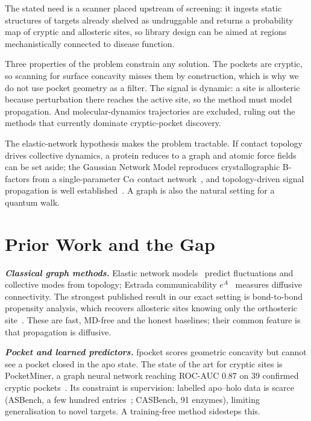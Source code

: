 \documentclass[10pt,a4paper]{article}
\newcommand{\lead}[1]{\textbf{\textit{#1}}}
\begin{document}
The stated need is a scanner placed upstream of screening: it ingests static structures of targets
already shelved as undruggable and returns a probability map of cryptic and allosteric sites, so
library design can be aimed at regions mechanistically connected to disease function.

Three properties of the problem constrain any solution. The pockets are cryptic, so scanning for
surface concavity misses them by construction, which is why we do not use pocket geometry as a
filter. The signal is dynamic: a site is allosteric because perturbation there reaches the active
site, so the method must model propagation. And molecular-dynamics trajectories are excluded, ruling
out the methods that currently dominate cryptic-pocket discovery.

The elastic-network hypothesis makes the problem tractable. If contact topology drives collective
dynamics, a protein reduces to a graph and atomic force fields can be set aside; the Gaussian Network
Model reproduces crystallographic B-factors from a single-parameter C$\alpha$ contact
network~\cite{bahar1997}, and topology-driven signal propagation is well
established~\cite{chennubhotla2007}. A graph is also the natural setting for a quantum walk.

\section{Prior Work and the Gap}

\lead{Classical graph methods.} Elastic network models~\cite{bahar1997,atilgan2001} predict
fluctuations and collective modes from topology; Estrada communicability
$e^{A}$~\cite{estrada2008} measures diffusive connectivity. The strongest published result in our
exact setting is bond-to-bond propensity analysis, which recovers allosteric sites knowing only the
orthosteric site~\cite{amor2016}. These are fast, MD-free and the honest baselines; their common
feature is that propagation is diffusive.

\lead{Pocket and learned predictors.} fpocket scores geometric concavity but cannot see a pocket
closed in the apo state. The state of the art for cryptic sites is PocketMiner, a graph neural
network reaching ROC-AUC $0.87$ on 39 confirmed cryptic pockets~\cite{meller2023}. Its constraint is
supervision: labelled apo--holo data is scarce (ASBench, a few hundred
entries~\cite{asbench2015}; CASBench, 91 enzymes), limiting generalisation to
novel targets. A training-free method sidesteps this.
\end{document}
